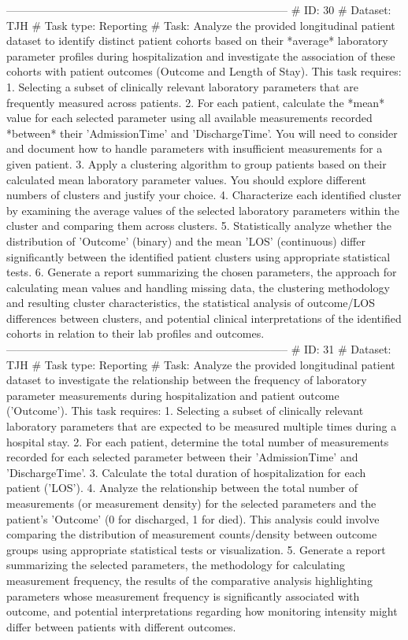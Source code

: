 \begin{tcolorbox}[colback=cadmiumgreen!5!white,colframe=forestgreen!75!white,breakable,title=\textit{Generated analytical tasks in task 4.}]
\begin{VerbatimWrap}
-----------------------------------------------------------------------------
# ID: 30  
# Dataset: TJH 
# Task type: Reporting
# Task: Analyze the provided longitudinal patient dataset to identify distinct patient cohorts based on their *average* laboratory parameter profiles during hospitalization and investigate the association of these cohorts with patient outcomes (Outcome and Length of Stay). This task requires: 1. Selecting a subset of clinically relevant laboratory parameters that are frequently measured across patients. 2. For each patient, calculate the *mean* value for each selected parameter using all available measurements recorded *between* their 'AdmissionTime' and 'DischargeTime'. You will need to consider and document how to handle parameters with insufficient measurements for a given patient. 3. Apply a clustering algorithm to group patients based on their calculated mean laboratory parameter values. You should explore different numbers of clusters and justify your choice. 4. Characterize each identified cluster by examining the average values of the selected laboratory parameters within the cluster and comparing them across clusters. 5. Statistically analyze whether the distribution of 'Outcome' (binary) and the mean 'LOS' (continuous) differ significantly between the identified patient clusters using appropriate statistical tests. 6. Generate a report summarizing the chosen parameters, the approach for calculating mean values and handling missing data, the clustering methodology and resulting cluster characteristics, the statistical analysis of outcome/LOS differences between clusters, and potential clinical interpretations of the identified cohorts in relation to their lab profiles and outcomes.
-----------------------------------------------------------------------------
# ID: 31  
# Dataset: TJH 
# Task type: Reporting
# Task: Analyze the provided longitudinal patient dataset to investigate the relationship between the frequency of laboratory parameter measurements during hospitalization and patient outcome ('Outcome'). This task requires: 1. Selecting a subset of clinically relevant laboratory parameters that are expected to be measured multiple times during a hospital stay. 2. For each patient, determine the total number of measurements recorded for each selected parameter between their 'AdmissionTime' and 'DischargeTime'. 3. Calculate the total duration of hospitalization for each patient ('LOS'). 4. Analyze the relationship between the total number of measurements (or measurement density) for the selected parameters and the patient's 'Outcome' (0 for discharged, 1 for died). This analysis could involve comparing the distribution of measurement counts/density between outcome groups using appropriate statistical tests or visualization. 5. Generate a report summarizing the selected parameters, the methodology for calculating measurement frequency, the results of the comparative analysis highlighting parameters whose measurement frequency is significantly associated with outcome, and potential interpretations regarding how monitoring intensity might differ between patients with different outcomes.

\end{VerbatimWrap}
\end{tcolorbox}
